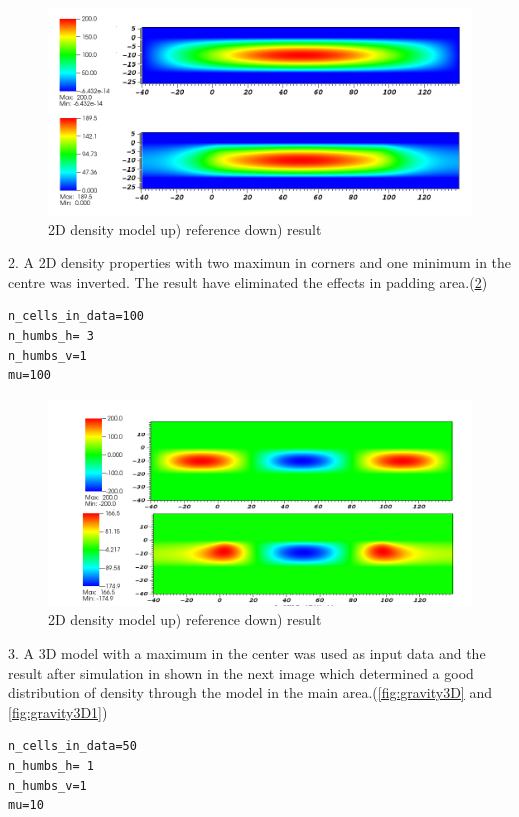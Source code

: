 \begin{figure}
\centering
\includegraphics[width=\textwidth]{grav2D1.png}
\caption{2D density model up) reference    down) result}
\label{fig:gravity2D1}
\end{figure}


2. A 2D density properties with two maximun in corners and one minimum in the centre was inverted. The result have eliminated the effects in padding area.(\ref{fig:gravity2D3}) \\
\begin{verbatim}
n_cells_in_data=100
n_humbs_h= 3
n_humbs_v=1
mu=100
\end{verbatim}

\begin{figure}
\centering
\includegraphics[width=\textwidth]{grav2D3.png}
\caption{2D density model up) reference  down) result}
\label{fig:gravity2D3}
\end{figure}

3. A 3D model with a maximum in the center was used as input data and the result after simulation in shown in the next image which determined a good distribution of density through the model in the main area.(\ref{fig:gravity3D} and \ref{fig:gravity3D1})\\
\begin{verbatim}
n_cells_in_data=50
n_humbs_h= 1
n_humbs_v=1
mu=10
\end{verbatim}

